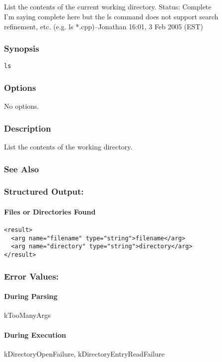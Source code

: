 \subsection{}
\label{ls}
List the contents of the current working directory. 
 Status: Complete\\ 
I'm saying complete here but the ls command does not support search refinement, etc. (e.g. ls *.cpp)--Jonathan 16:01, 3 Feb 2005 (EST) 
\subsubsection*{Synopsis}
\begin{verbatim}
ls
\end{verbatim}
\subsubsection*{Options}
 No options. 
\subsubsection*{Description}
 List the contents of the working directory. 
\subsubsection*{See Also}
\subsubsection*{Structured Output:}
\paragraph*{Files or Directories Found}
\begin{verbatim}
<result>
  <arg name="filename" type="string">filename</arg>
  <arg name="directory" type="string">directory</arg>
</result>
\end{verbatim}
\subsubsection*{Error Values:}
\paragraph*{During Parsing}
 kTooManyArgs
\paragraph*{During Execution}
 kDirectoryOpenFailure, kDirectoryEntryReadFailure
